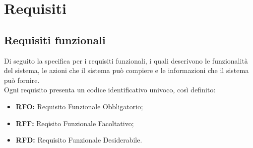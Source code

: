 \pagebreak
\section{Requisiti}
\subsection{Requisiti funzionali}

Di seguito la specifica per i requisiti funzionali, i quali descrivono le funzionalità del sistema, le azioni che il sistema può compiere e le informazioni che il sistema può fornire.\\
Ogni requisito presenta un codice identificativo univoco, così definito:
\begin{itemize}
    \item \textbf{RFO:} Requisito Funzionale Obbligatorio;
    \item \textbf{RFF:} Reqisito Funzionale Facoltativo;
    \item \textbf{RFD:} Requisito Funzionale Desiderabile.
\end{itemize}


